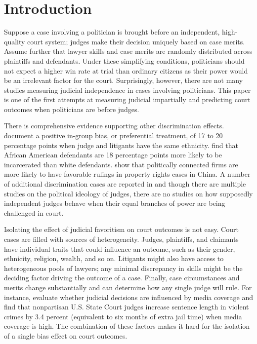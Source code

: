\documentclass[11pt]{article}
\begin{document}
\clearpage

\section{Introduction} \label{sec:introduction_paper2}

Suppose a case involving a politician is brought before an independent, high-quality court system; judges make their decision uniquely based on case merits. Assume further that lawyer skills and case merits are randomly distributed across plaintiffs and defendants. Under these simplifying conditions, politicians should not expect a higher win rate at trial than ordinary citizens as their power would be an irrelevant factor for the court. Surprisingly, however, there are not many studies measuring judicial independence in cases involving politicians. This paper is one of the first attempts at measuring judicial impartially and predicting court outcomes when politicians are before judges.

There is comprehensive evidence supporting other discrimination effects. \citet{ShayoJudicialIngroupBias2011} document a positive in-group bias, or preferential treatment, of 17 to 20 percentage points when judge and litigants have the same ethnicity. \citet{AbramsJudgesVaryTheir2012} find that African American defendants are 18 percentage points more likely to be incarcerated than white defendants. \citet{LuPoliticalConnectednessCourt2015} show that politically connected firms are more likely to have favorable rulings in property rights cases in China. A number of additional discrimination cases are reported in \citet{RachlinskiJudgingJudiciaryNumbers2017} and though there are multiple studies on the political ideology of judges, there are no studies on how supposedly independent judges behave when their equal branches of power are being challenged in court.

Isolating the effect of judicial favoritism on court outcomes is not easy. Court cases are filled with sources of heterogeneity. Judges, plaintiffs, and claimants have individual traits that could influence an outcome, such as their gender, ethnicity, religion, wealth, and so on. Litigants might also have access to heterogeneous pools of lawyers; any minimal discrepancy in skills might be the deciding factor driving the outcome of a case. Finally, case circumstances and merits change substantially and can determine how any single judge will rule. For instance, \citet{LimJudgePoliticianPress2015} evaluate whether judicial decisions are influenced by media coverage and find that nonpartisan U.S. State Court judges increase sentence length in violent crimes by 3.4 percent (equivalent to six months of extra jail time) when media coverage is high. The combination of these factors makes it hard for the isolation of a single bias effect on court outcomes.
\end{document}
